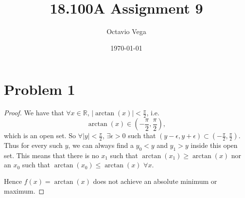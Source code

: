 \documentclass{article}
\title{18.100A Assignment 9}
\author{Octavio Vega}
\date\today
\newcommand{\R}{\mathbb{R}} %
\begin{document}
\maketitle

\section*{Problem 1}
\begin{proof}
	We have that $\forall x \in \R$, $|\arctan(x)| < \frac{\pi}{2}$, i.e.
	\begin{equation}
		\arctan(x) \in \left(-\frac{\pi}{2}, \frac{\pi}{2}\right),
	\end{equation}
	which is an open set. So $\forall |y| < \frac{\pi}{2}$, $\exists \epsilon > 0$ such that $(y - \epsilon, y + \epsilon) \subset (-\frac{\pi}{2}, \frac{\pi}{2})$. Thus for every such $y$, we can always find a $y_0 < y$ and $y_1 > y$ inside this open set. This means that there is no $x_1$ such that $\arctan(x_1) \geq \arctan(x)$ nor an $x_0$ such that $\arctan(x_0) \leq \arctan(x)$ $\forall x$.
	
	Hence $f(x) = \arctan(x)$ does not achieve an absolute minimum or maximum.
\end{proof}
\end{document}
